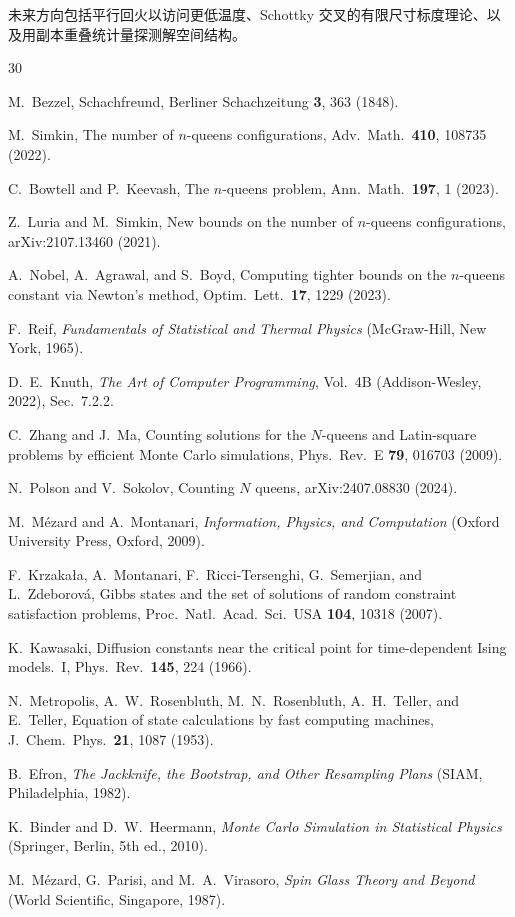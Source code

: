 \documentclass[aps, pre, reprint, amsmath, amssymb, superscriptaddress, floatfix]{revtex4-2}
\begin{document}
未来方向包括平行回火以访问更低温度、Schottky 交叉的有限尺寸标度理论、以及用副本重叠统计量探测解空间结构。


\begin{thebibliography}{30}

M.~Bezzel,
Schachfreund, Berliner Schachzeitung \textbf{3}, 363 (1848).

M.~Simkin,
The number of $n$-queens configurations,
Adv.\ Math.\ \textbf{410}, 108735 (2022).

C.~Bowtell and P.~Keevash,
The $n$-queens problem,
Ann.\ Math.\ \textbf{197}, 1 (2023).

Z.~Luria and M.~Simkin,
New bounds on the number of $n$-queens configurations,
arXiv:2107.13460 (2021).

A.~Nobel, A.~Agrawal, and S.~Boyd,
Computing tighter bounds on the $n$-queens constant via Newton's
method,
Optim.\ Lett.\ \textbf{17}, 1229 (2023).

F.~Reif,
\textit{Fundamentals of Statistical and Thermal Physics}
(McGraw-Hill, New York, 1965).

D.~E.~Knuth,
\textit{The Art of Computer Programming}, Vol.~4B
(Addison-Wesley, 2022), Sec.~7.2.2.

C.~Zhang and J.~Ma,
Counting solutions for the $N$-queens and Latin-square problems by
efficient Monte Carlo simulations,
Phys.\ Rev.\ E \textbf{79}, 016703 (2009).

N.~Polson and V.~Sokolov,
Counting $N$ queens,
arXiv:2407.08830 (2024).

M.~M\'ezard and A.~Montanari,
\textit{Information, Physics, and Computation}
(Oxford University Press, Oxford, 2009).

F.~Krzaka{\l}a, A.~Montanari, F.~Ricci-Tersenghi,
G.~Semerjian, and L.~Zdeborov\'a,
Gibbs states and the set of solutions of random constraint
satisfaction problems,
Proc.\ Natl.\ Acad.\ Sci.\ USA \textbf{104}, 10318 (2007).

K.~Kawasaki,
Diffusion constants near the critical point for time-dependent Ising
models.\ I,
Phys.\ Rev.\ \textbf{145}, 224 (1966).

N.~Metropolis, A.~W.~Rosenbluth, M.~N.~Rosenbluth, A.~H.~Teller,
and E.~Teller,
Equation of state calculations by fast computing machines,
J.~Chem.~Phys.\ \textbf{21}, 1087 (1953).

B.~Efron,
\textit{The Jackknife, the Bootstrap, and Other Resampling Plans}
(SIAM, Philadelphia, 1982).

K.~Binder and D.~W.~Heermann,
\textit{Monte Carlo Simulation in Statistical Physics}
(Springer, Berlin, 5th ed., 2010).

M.~M\'ezard, G.~Parisi, and M.~A.~Virasoro,
\textit{Spin Glass Theory and Beyond}
(World Scientific, Singapore, 1987).

\end{thebibliography}
\end{document}
